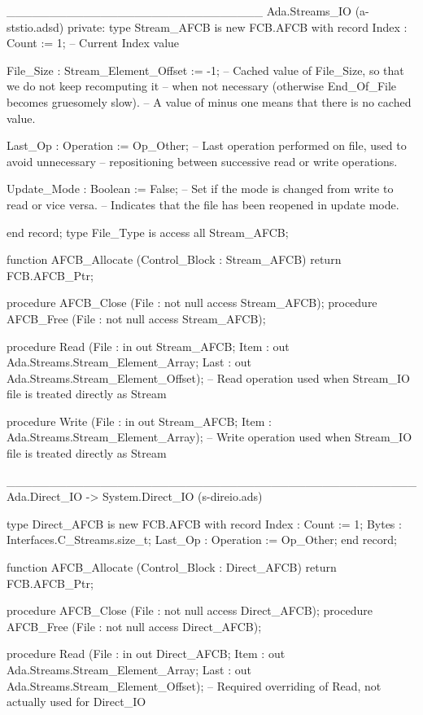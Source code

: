 ______________________________
Ada.Streams_IO (a-ststio.adsd)
private:
   type Stream_AFCB is new FCB.AFCB with record
      Index : Count := 1;
      --  Current Index value

      File_Size : Stream_Element_Offset := -1;
      --  Cached value of File_Size, so that we do not keep recomputing it
      --  when not necessary (otherwise End_Of_File becomes gruesomely slow).
      --  A value of minus one means that there is no cached value.

      Last_Op : Operation := Op_Other;
      --  Last operation performed on file, used to avoid unnecessary
      --  repositioning between successive read or write operations.

      Update_Mode : Boolean := False;
      --  Set if the mode is changed from write to read or vice versa.
      --  Indicates that the file has been reopened in update mode.

   end record;
   type File_Type is access all Stream_AFCB;

   function AFCB_Allocate (Control_Block : Stream_AFCB) return FCB.AFCB_Ptr;

   procedure AFCB_Close (File : not null access Stream_AFCB);
   procedure AFCB_Free  (File : not null access Stream_AFCB);

   procedure Read
     (File : in out Stream_AFCB;
      Item : out Ada.Streams.Stream_Element_Array;
      Last : out Ada.Streams.Stream_Element_Offset);
   --  Read operation used when Stream_IO file is treated directly as Stream

   procedure Write
     (File : in out Stream_AFCB;
      Item : Ada.Streams.Stream_Element_Array);
   --  Write operation used when Stream_IO file is treated directly as Stream

________________________________________________
Ada.Direct_IO -> System.Direct_IO (s-direio.ads)

   type Direct_AFCB is new FCB.AFCB with record
      Index   : Count := 1;
      Bytes   : Interfaces.C_Streams.size_t;
      Last_Op : Operation := Op_Other;
   end record;

   function AFCB_Allocate (Control_Block : Direct_AFCB) return FCB.AFCB_Ptr;

   procedure AFCB_Close (File : not null access Direct_AFCB);
   procedure AFCB_Free  (File : not null access Direct_AFCB);

   procedure Read
     (File : in out Direct_AFCB;
      Item : out Ada.Streams.Stream_Element_Array;
      Last : out Ada.Streams.Stream_Element_Offset);
   --  Required overriding of Read, not actually used for Direct_IO

